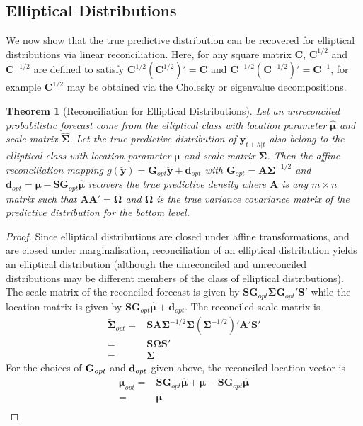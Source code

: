 \documentclass[a4paper, 11pt]{article}
\theoremstyle{theo}
\newtheorem{theo}{Theorem}[section]
\theoremstyle{definition}
\begin{document}
\subsection{Elliptical Distributions}
We now show that the true predictive distribution can be recovered for elliptical distributions via linear reconciliation.  Here, for any square matrix ${\bm C}$, ${\bm C}^{1/2}$ and ${\bm C}^{-1/2}$ are defined to satisfy ${\bm C}^{1/2}\left({\bm C}^{1/2}\right)'={\bm C}$ and ${\bm C}^{-1/2}\left({\bm C}^{-1/2}\right)'={\bm C}^{-1}$, for example ${\bm C}^{1/2}$ may be obtained via the Cholesky or eigenvalue decompositions. 
\begin{theo}[Reconciliation for Elliptical Distributions]
	Let an unreconciled probabilistic forecast come from the elliptical class with location parameter $\hat{\bm \mu}$ and scale matrix $\hat{\bm \Sigma}$.  Let the true predictive distribution of ${\bm y}_{t+h|t}$ also belong to the elliptical class with location parameter ${\bm \mu}$ and scale matrix ${\bm \Sigma}$.  Then the affine reconciliation mapping $g(\breve{\bm y})={\bm G}_{opt}\breve{\bm y}+{\bm d}_{opt}$ with $\bm{G}_{opt}={\bm A}{\bm\Sigma}^{-1/2}$ and ${\bm d}_{opt}={\bm \mu}-{\bm S}{\bm G}_{opt}\hat{\bm \mu}$ recovers the true predictive density where ${\bm A}$ is any $m\times n$ matrix such that ${\bm A}{\bm A}'={\bm \Omega}$ and ${\bm \Omega}$ is the true variance covariance matrix of the predictive distribution for the bottom level. 
\end{theo}
\begin{proof}
   Since elliptical distributions are closed under affine transformations, and are closed under marginalisation, reconciliation of an elliptical distribution yields an elliptical distribution (although the unreconciled and unreconciled distributions may be different members of the class of elliptical distributions).  The scale matrix of the reconciled forecast is given by $\bm{S}\bm{G}_{opt}{\bm \Sigma}{\bm G}_{opt}'{\bm S}'$ while the location matrix is given by $\bm{S}\bm{G}_{opt}\hat{\bm \mu}+{\bm d}_{opt}$.  The reconciled scale matrix is 
   \begin{align*}
   \tilde{\bm \Sigma}_{opt}=&{\bm S}{\bm A}{\bm\Sigma}^{-1/2}{\bm \Sigma}\left({\bm\Sigma}^{-1/2}\right)'{\bm A}'{\bm S}'\\
   =&{\bm S}{\bm \Omega}{\bm S}'\\
   =&{\bm \Sigma}
   \end{align*}
   For the choices of ${\bf G}_{opt}$ and ${\bf d}_{opt}$ given above, the reconciled location vector is 
   \begin{align*}
   \tilde{\bm \mu}_{opt}=&{\bm S}{\bm G}_{opt}\hat{\bm \mu}+{\bm \mu}-{\bm S}{\bm G}_{opt}\hat{\bm \mu}\\
   =&{\bm \mu}\\
   \end{align*}
\end{proof}	
\end{document}
